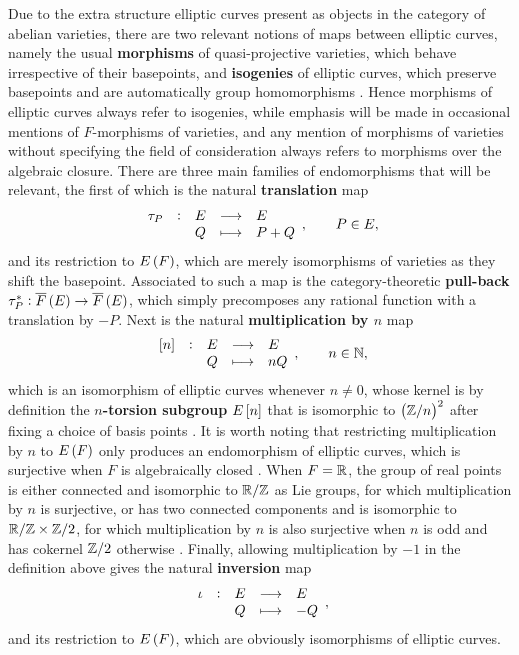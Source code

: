 Due to the extra structure elliptic curves present as objects in the category of abelian varieties, there are two relevant notions of maps between elliptic curves, namely the usual \textbf{morphisms} of quasi-projective varieties, which behave irrespective of their basepoints, and \textbf{isogenies} of elliptic curves, which preserve basepoints and are automatically group homomorphisms \cite[Theorem III.4.8]{Sil09}. Hence morphisms of elliptic curves always refer to isogenies, while emphasis will be made in occasional mentions of $ F $-morphisms of varieties, and any mention of morphisms of varieties without specifying the field of consideration always refers to morphisms over the algebraic closure. There are three main families of endomorphisms that will be relevant, the first of which is the natural \textbf{translation} map
$$ \function[\tau_P]{E}{E}{Q}{P + Q}, \qquad P \in E, $$
and its restriction to $ E\br{F} $, which are merely isomorphisms of varieties as they shift the basepoint. Associated to such a map is the category-theoretic \textbf{pull-back} $ \tau_P^* : \overline{F}\br{E} \to \overline{F}\br{E} $, which simply precomposes any rational function with a translation by $ -P $. Next is the natural \textbf{multiplication by $ n $} map
$$ \function[\sbr{n}]{E}{E}{Q}{nQ}, \qquad n \in \NN, $$
which is an isomorphism of elliptic curves whenever $ n \ne 0 $, whose kernel is by definition the \textbf{$ n $-torsion subgroup} $ E\sbr{n} $ that is isomorphic to $ \br{\ZZ / n}^2 $ after fixing a choice of basis points \cite[Corollary III.6.4(b)]{Sil09}. It is worth noting that restricting multiplication by $ n $ to $ E\br{F} $ only produces an endomorphism of elliptic curves, which is surjective when $ F $ is algebraically closed \cite[Theorem II.2.3]{Sil09}. When $ F = \mathbb{R} $, the group of real points is either connected and isomorphic to $ \mathbb{R} / \mathbb{Z} $ as Lie groups, for which multiplication by $ n $ is surjective, or has two connected components and is isomorphic to $ \mathbb{R} / \mathbb{Z} \times \mathbb{Z} / 2 $, for which multiplication by $ n $ is also surjective when $ n $ is odd and has cokernel $ \mathbb{Z} / 2 $ otherwise \cite[Corollary V.2.3.1]{Sil94}. Finally, allowing multiplication by $ -1 $ in the definition above gives the natural \textbf{inversion} map
$$ \function[\iota]{E}{E}{Q}{-Q}, $$
and its restriction to $ E\br{F} $, which are obviously isomorphisms of elliptic curves.

\pagebreak

